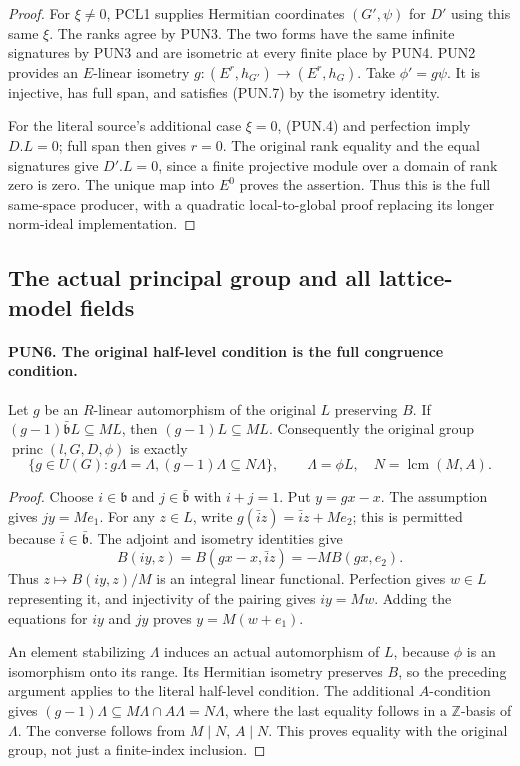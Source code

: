 \begin{proof}
For \(\xi\ne0\), PCL1 supplies Hermitian coordinates
\((G',\psi)\) for \(D'\) using this same \(\xi\).  The ranks
agree by PUN3.  The two forms have the same infinite signatures
by PUN3 and are isometric at every finite place by PUN4.  PUN2
provides an \(E\)-linear isometry
\(g:(E^r,h_{G'})\longrightarrow(E^r,h_G)\).
Take \(\phi'=g\psi\).  It is injective, has full span, and
satisfies (PUN.7) by the isometry identity.

For the literal source's additional case \(\xi=0\), (PUN.4)
and perfection imply \(D.L=0\); full span then gives \(r=0\).
The original rank equality and the equal signatures give
\(D'.L=0\), since a finite projective module over a domain of
rank zero is zero.  The unique map into \(E^0\) proves the
assertion.  Thus this is the full same-space producer, with a
quadratic local-to-global proof replacing its longer norm-ideal
implementation.
\end{proof}

\subsection{The actual principal group and all lattice-model fields}

\paragraph{PUN6. The original half-level condition is the full congruence condition.}
\label{claim:PUN6}
Let \(g\) be an \(R\)-linear automorphism of the original \(L\)
preserving \(B\).  If
\((g-1)\bar{\mathfrak b}L\subseteq ML\), then
\((g-1)L\subseteq ML\).  Consequently the original group
\(\operatorname{princ}(l,G,D,\phi)\) is exactly
\[
 \{g\in U(G):g\Lambda=\Lambda,
                        (g-1)\Lambda\subseteq N\Lambda\},
 \qquad \Lambda=\phi L,\quad N=\operatorname{lcm}(M,A).
 \tag{PUN.8}
\]

\begin{proof}
Choose \(i\in\mathfrak b\) and \(j\in\bar{\mathfrak b}\)
with \(i+j=1\).  Put \(y=gx-x\).  The assumption gives
\(jy=Me_1\).  For any \(z\in L\), write
\(g(\bar i z)=\bar i z+Me_2\); this is permitted because
\(\bar i\in\bar{\mathfrak b}\).  The adjoint and isometry
identities give
\[
 B(iy,z)=B(gx-x,\bar i z)=-M B(gx,e_2).
 \tag{PUN.9}
\]
Thus \(z\mapsto B(iy,z)/M\) is an integral linear functional.
Perfection gives \(w\in L\) representing it, and injectivity of
the pairing gives \(iy=Mw\).  Adding the equations for \(iy\)
and \(jy\) proves \(y=M(w+e_1)\).

An element stabilizing \(\Lambda\) induces an actual automorphism
of \(L\), because \(\phi\) is an isomorphism onto its range.
Its Hermitian isometry preserves \(B\), so the preceding argument
applies to the literal half-level condition.  The additional
\(A\)-condition gives
\((g-1)\Lambda\subseteq M\Lambda\cap A\Lambda=N\Lambda\),
where the last equality follows in a \(\mathbb Z\)-basis of
\(\Lambda\).  The converse follows from \(M\mid N\),
\(A\mid N\).  This proves equality with the original group,
not just a finite-index inclusion.
\end{proof}


